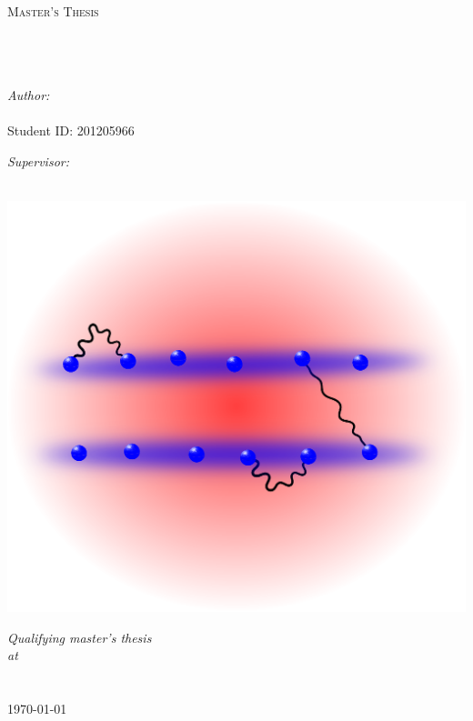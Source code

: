 \documentclass[11pt, twoside]{Thesis}
\begin{document}
\begin{titlepage}
\begin{center}

\textsc{\LARGE \univname}\\[1.5cm] %
\textsc{\Large Master's Thesis}\\[0.5cm] %

\HRule \\[0.4cm] %
{\huge \bfseries \ttitle}\\[0.4cm] %
\HRule \\[1.5cm] %
 
\begin{minipage}[t]{0.4\textwidth}
\begin{flushleft} \large
\emph{Author:}\\
{\authornames}\\ 
{Student ID: 201205966} %
\end{flushleft}
\end{minipage}%
\begin{minipage}[t]{0.4\textwidth}
\begin{flushright} \large
\emph{Supervisor:} \\
{\supname} %
\end{flushright}
\end{minipage}\\[0cm]
\vspace{1.5cm}
\includegraphics[width=0.6\columnwidth]{1D3Dsketchfrontpage.eps} 
 
\large \textit{Qualifying master's thesis}\\[0.1cm] %
\textit{at}\\[0.2cm]
\deptname \\ \facname \\[1cm] %


 
{\large \today} %

 
\vfill
\end{center}

\end{titlepage}
\end{document}
